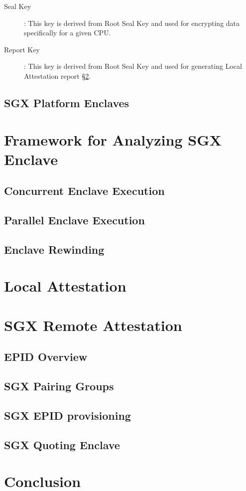 \documentclass[11pt]{article}
\newcommand{\secref}[1]{\S\ref{#1}}
\begin{document}
\begin{description}
      \item[Seal Key]: This key is derived from Root Seal Key and used
      for encrypting data specifically for a given CPU.

      \item[Report Key]: This key is derived from Root Seal Key and used 
      for generating Local Attestation report \secref{sec:localatt}.

  \end{description}

  \subsection{SGX Platform Enclaves}
  

  \section{Framework for Analyzing SGX Enclave}
  \subsection{Concurrent Enclave Execution}
  \subsection{Parallel Enclave Execution}
  \subsection{Enclave Rewinding}

  \section{Local Attestation}
  \label{sec:localatt}

  \section{SGX Remote Attestation}
  \label{sec:remoteatt}

  \subsection{EPID Overview}
  \label{ssec:epid}

  \subsection{SGX Pairing Groups}
  \label{ssec:pairings}

  \subsection{SGX EPID provisioning}
  \label{ssec:epidprov}
  
  \subsection{SGX Quoting Enclave}
  \label{ssec:qe}

  \section{Conclusion}
  \label{sec:conclusion}



\end{document}
